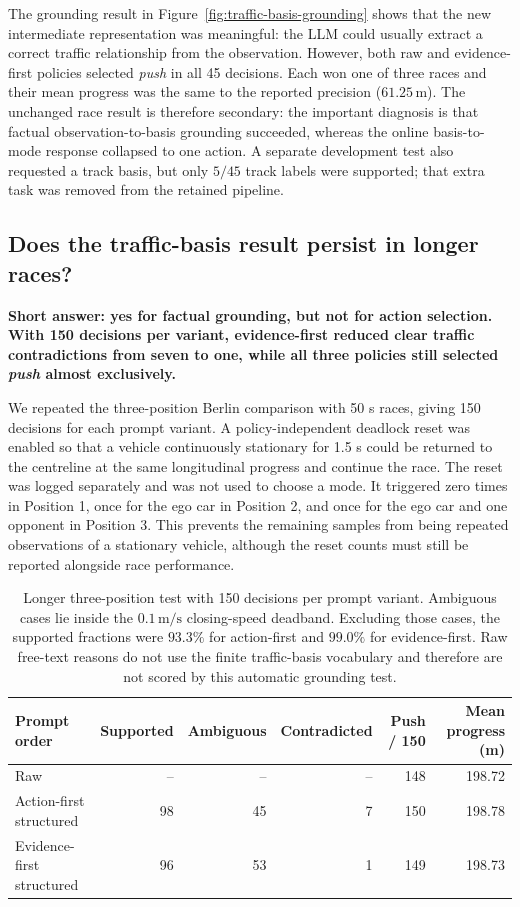 \documentclass[11pt]{article}
\begin{document}
The grounding result in Figure~\ref{fig:traffic-basis-grounding} shows that the
new intermediate representation was meaningful: the LLM could usually extract
a correct traffic relationship from the observation. However, both raw and
evidence-first policies selected \emph{push} in all 45 decisions. Each won one
of three races and their mean progress was the same to the reported precision
($61.25\,\mathrm{m}$). The unchanged race result is therefore secondary: the
important diagnosis is that factual observation-to-basis grounding succeeded,
whereas the online basis-to-mode response collapsed to one action. A separate
development test also requested a track basis, but only $5/45$ track labels
were supported; that extra task was removed from the retained pipeline.

\subsection{Does the traffic-basis result persist in longer races?}

\noindent\textbf{Short answer: yes for factual grounding, but not for action
selection. With 150 decisions per variant, evidence-first reduced clear traffic
contradictions from seven to one, while all three policies still selected
\emph{push} almost exclusively.}

We repeated the three-position Berlin comparison with 50 s races, giving 150
decisions for each prompt variant. A policy-independent deadlock reset was
enabled so that a vehicle continuously stationary for 1.5 s could be returned
to the centreline at the same longitudinal progress and continue the race. The
reset was logged separately and was not used to choose a mode. It triggered
zero times in Position 1, once for the ego car in Position 2, and once for the
ego car and one opponent in Position 3. This prevents the remaining samples
from being repeated observations of a stationary vehicle, although the reset
counts must still be reported alongside race performance.

\begin{table}[ht]
  \centering
  \small
  \begin{tabular}{lrrrrr}
    \toprule
    Prompt order & Supported & Ambiguous & Contradicted
      & Push / 150 & Mean progress (m) \\
    \midrule
    Raw                         & -- & -- & -- & 148 & 198.72 \\
    Action-first structured     & 98 & 45 & 7 & 150 & 198.78 \\
    Evidence-first structured   & 96 & 53 & 1 & 149 & 198.73 \\
    \bottomrule
  \end{tabular}
  \caption{Longer three-position test with 150 decisions per prompt variant.
  Ambiguous cases lie inside the $0.1\,\mathrm{m/s}$ closing-speed deadband.
  Excluding those cases, the supported fractions were $93.3\%$ for
  action-first and $99.0\%$ for evidence-first. Raw free-text reasons do not use
  the finite traffic-basis vocabulary and therefore are not scored by this
  automatic grounding test.}
  \label{tab:traffic-basis-long-run}
\end{table}
\end{document}
